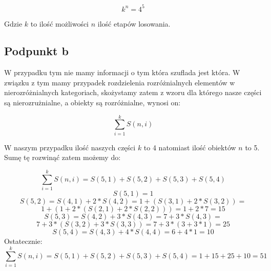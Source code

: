 \documentclass[paper=a4, fontsize=11pt]{scrartcl} %
\numberwithin{equation}{section} %
\numberwithin{figure}{section} %
\numberwithin{table}{section} %
\begin{document}
\begin{equation}
  k^n = 4 ^ 5
\end{equation}

Gdzie \(k\) to ilość możliwości \(n\) ilość etapów losowania.

\subsection{Podpunkt b}

W przypadku tym nie mamy informacji o tym która szuflada jest która.
W związku z tym mamy przypadek rozdzielenia rozróżnialnych elementów
w nierozróżnialnych kategoriach,  skożystamy zatem z wzoru dla którego
nasze części są nierozrużnialne, a obiekty są rozróżnialne, wynosi on:

\begin{equation}
  \sum_{i=1}^{k}S(n,i)
\end{equation}

W naszym przypadku ilość naszych części \(k\) to 4 natomiast ilość obiektów \(n\) to 5.
Sumę tę rozwinąć zatem możemy do:

\begin{equation}
  \sum_{i=1}^{k}S(n,i) = S(5,1) + S(5,2) + S(5,3) + S(5,4)
\end{equation}
\begin{equation}
  S(5,1) = 1
\end{equation}
\begin{equation}
  \nonumber
  S(5,2) = S(4,1) + 2 * S(4,2) = 1 + (S(3,1) + 2 * S(3,2)) = 
\end{equation}
\begin{equation}
  1 + ( 1 + 2 * (S(2,1) + 2 * S(2,2))) = 1 + 2 * 7 = 15
\end{equation}
\begin{equation}
  \nonumber
  S(5,3) = S(4,2) + 3 * S(4,3) = 7 + 3 * S(4,3) = 
\end{equation}
\begin{equation}
  7 + 3 * (S(3,2) + 3 * S(3,3)) = 7 + 3 * ( 3 + 3 * 1) = 25
\end{equation}
\begin{equation}
  S(5,4) = S(4,3) + 4 * S(4,4) = 6 + 4 * 1 = 10
\end{equation}
Ostatecznie:
\begin{equation}
  \sum_{i=1}^{k}S(n,i) = S(5,1) + S(5,2) + S(5,3) + S(5,4) = 1 + 15 + 25 + 10 = 51 
\end{equation}
\end{document}
